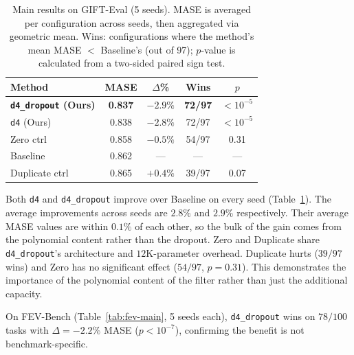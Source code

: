 \documentclass{article}
\begin{document}
\begin{table}[t]
\caption{Main results on GIFT-Eval (5 seeds). MASE is averaged per configuration across seeds, then aggregated via geometric mean. Wins: configurations where the method's mean MASE $<$ Baseline's (out of 97); $p$-value is calculated from a two-sided paired sign test.}
\label{tab:main}
\vskip 0.1in
\centering
\begin{small}
\setlength{\tabcolsep}{3pt}
\begin{tabular}{lcccc}
\toprule
\textbf{Method} & \textbf{MASE} & \textbf{$\Delta$\%} & \textbf{Wins} & \textbf{$p$} \\
\midrule
\textbf{\texttt{d4\_dropout} (Ours)} & \textbf{0.837} & \textbf{$-2.9\%$} & \textbf{72/97} & $< 10^{-5}$ \\
\texttt{d4} (Ours)         & 0.838          & $-2.8\%$       & 72/97 & $< 10^{-5}$ \\
Zero ctrl                  & 0.858          & $-0.5\%$       & 54/97 & 0.31 \\
Baseline                   & 0.862          & ---            & ---   & --- \\
Duplicate ctrl             & 0.865          & $+0.4\%$       & 39/97 & 0.07 \\
\bottomrule
\end{tabular}
\end{small}
\vskip -0.1in
\end{table}

Both \texttt{d4} and \texttt{d4\_dropout} improve over Baseline on every seed (Table~\ref{tab:main}). The average improvements across seeds are $2.8\%$ and $2.9\%$ respectively. Their average MASE values are within $0.1\%$ of each other, so the bulk of the gain comes from the polynomial content rather than the dropout. Zero and Duplicate share \texttt{d4\_dropout}'s architecture and $12$K-parameter overhead. Duplicate hurts ($39/97$ wins) and Zero has no significant effect ($54/97$, $p = 0.31$). This demonstrates the importance of the polynomial content of the filter rather than just the additional capacity.

On  FEV-Bench (Table~\ref{tab:fev-main}, 5 seeds each), \texttt{d4\_dropout} wins on $78/100$ tasks with $\Delta = -2.2\%$ MASE ($p < 10^{-7}$), confirming the benefit is not benchmark-specific.
\end{document}
